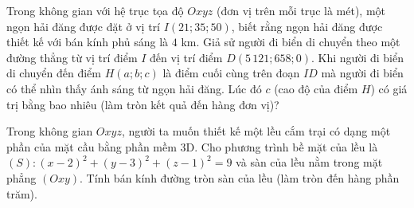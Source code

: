 \begin{bt}%
	Trong không gian với hệ trục tọa độ $Oxyz$ (đơn vị trên mỗi trục là mét), một ngọn hải đăng được đặt ở vị trí $I(21; 35; 50)$, biết rằng ngọn hải đăng được thiết kế với bán kính phủ sáng là $4$ km. Giả sử người đi biển di chuyển theo một đường thẳng từ vị trí điểm $I$ đến vị trí điểm $D(5\,121; 658; 0)$. Khi người đi biển di chuyển đến điểm $H(a; b; c)$ là điểm cuối cùng trên đoạn $ID$ mà người đi biển có thể nhìn thấy ánh sáng từ ngọn hải đăng. Lúc đó $c$ (cao độ của điểm $H$) có giá trị  bằng bao nhiêu (làm tròn kết quả đến hàng đơn vị)?
\end{bt}

\begin{bt}%
	Trong không gian $Oxyz$, người  ta muốn thiết kế một lều cắm trại có dạng một phần của mặt cầu bằng phần mềm 3D. Cho phương trình bề mặt của lều là $(S) \colon (x-2)^2+(y-3)^2+(z-1)^2=9$ và sàn của lều nằm trong mặt phẳng $(Oxy)$. Tính bán kính đường tròn sàn của lều (làm tròn đến hàng phần trăm).
\end{bt}

